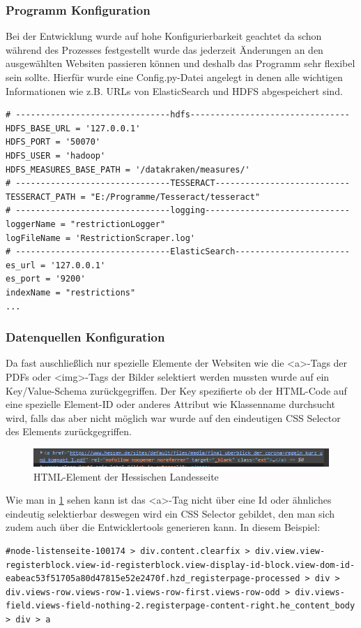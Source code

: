 \documentclass[12pt,oneside,a4paper,parskip]{scrbook}
\begin{document}
\subsubsection{Programm Konfiguration}
Bei der Entwicklung wurde auf hohe Konfigurierbarkeit geachtet da schon während des Prozesses festgestellt wurde das jederzeit Änderungen an den ausgewählten Websiten passieren können und deshalb das Programm sehr flexibel sein sollte. Hierfür wurde eine Config.py-Datei angelegt in denen alle wichtigen Informationen wie z.B. URLs von ElasticSearch und HDFS abgespeichert sind.

\begin{lstlisting}[caption=Config für das Programm]
# -------------------------------hdfs--------------------------------
HDFS_BASE_URL = '127.0.0.1'
HDFS_PORT = '50070'
HDFS_USER = 'hadoop'
HDFS_MEASURES_BASE_PATH = '/datakraken/measures/'
# -------------------------------TESSERACT---------------------------
TESSERACT_PATH = "E:/Programme/Tesseract/tesseract"
# -------------------------------logging-----------------------------
loggerName = "restrictionLogger"
logFileName = 'RestrictionScraper.log'
# -------------------------------ElasticSearch-----------------------
es_url = '127.0.0.1'
es_port = '9200'
indexName = "restrictions"
...
\end{lstlisting}

\pagebreak

\subsubsection{Datenquellen Konfiguration}
Da fast auschließlich nur spezielle Elemente der Websiten wie die \textless a\textgreater -Tags der PDFs oder  \textless img\textgreater -Tags der Bilder selektiert werden mussten wurde auf ein Key/Value-Schema zurückgegriffen. Der Key spezifierte ob der HTML-Code auf eine spezielle Element-ID oder anderes Attribut wie Klassenname durchsucht wird, falls das aber nicht möglich war wurde auf den eindeutigen CSS Selector des Elements zurückgegriffen.

\begin{figure}[H]
\caption{HTML-Element der Hessischen Landesseite}
\label{htmlHessen}
\centering
\includegraphics[scale=1.0]{hessenHTMLexample.png}
\end{figure}

Wie man in \cref{htmlHessen} sehen kann ist das \textless a\textgreater -Tag nicht über eine Id oder ähnliches eindeutig selektierbar deswegen wird ein CSS Selector gebildet, den man sich zudem auch über die Entwicklertools generieren kann. In diesem Beispiel:
\begin{lstlisting}[caption=CSS Selector]
#node-listenseite-100174 > div.content.clearfix > div.view.view-registerblock.view-id-registerblock.view-display-id-block.view-dom-id-eabeac53f51705a80d47815e52e2470f.hzd_registerpage-processed > div > div.views-row.views-row-1.views-row-first.views-row-odd > div.views-field.views-field-nothing-2.registerpage-content-right.he_content_body > div > a
\end{lstlisting}
\end{document}
